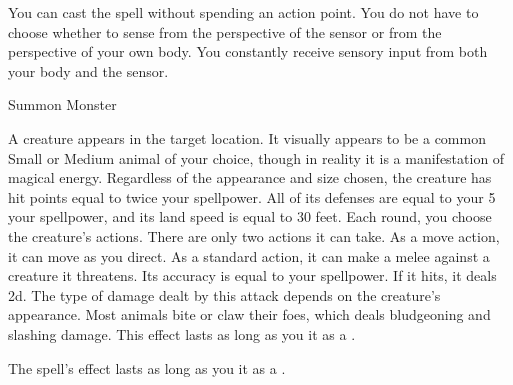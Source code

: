You can cast the spell without spending an action point.
You do not have to choose whether to sense from the perspective of the sensor or from the perspective of your own body.
You constantly receive sensory input from both your body and the sensor.
\begin{spellsection}{Summon Monster}
\begin{spellheader}
\end{spellheader}
\begin{spellcontent}
\begin{spelltargetinginfo}
\end{spelltargetinginfo}
\begin{spelleffects}
\spelleffect
A creature appears in the target location.
It visually appears to be a common Small or Medium animal of your choice, though in reality it is a manifestation of magical energy.
Regardless of the appearance and size chosen, the creature has hit points equal to twice your spellpower.
All of its defenses are equal to your 5 \add your spellpower, and its land speed is equal to 30 feet.
Each round, you choose the creature's actions.
There are only two actions it can take.
As a move action, it can move as you direct.
As a standard action, it can make a melee  against a creature it threatens.
Its accuracy is equal to your spellpower.
If it hits, it deals  \minus2d.
The type of damage dealt by this attack depends on the creature's appearance.
Most animals bite or claw their foes, which deals bludgeoning and slashing damage.
This effect lasts as long as you  it as a .
\end{spelleffects}
\end{spellcontent}
\begin{spellfooter}
\end{spellfooter}
\begin{spellsubcontent}
\begin{spellcantrip}
The spell's effect lasts as long as you  it as a .
\end{spellcantrip}
\end{spellsubcontent}
\end{spellsection}
